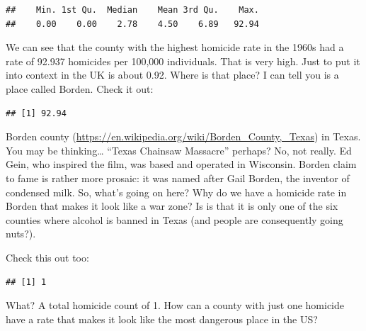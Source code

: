 \documentclass[
  krantz2]{krantz}
\makeatletter
\newenvironment{Shaded}{\begin{snugshade}}{\end{snugshade}}
\newcommand{\FunctionTok}[1]{\textcolor[rgb]{0,0,0}{#1}}
\newcommand{\NormalTok}[1]{#1}
\newcommand{\OtherTok}[1]{\textcolor[rgb]{0.37,0.37,0.37}{#1}}
\newcommand{\SpecialCharTok}[1]{\textcolor[rgb]{0,0,0}{#1}}
\newcommand{\StringTok}[1]{\textcolor[rgb]{0.5,0.5,0.5}{#1}}
\newenvironment{kframe}{%
\medskip{}
\setlength{\fboxsep}{.8em}
 \def\at@end@of@kframe{}%
 \ifinner\ifhmode%
  \def\at@end@of@kframe{\end{minipage}}%
  \begin{minipage}{\columnwidth}%
 \fi\fi%
 \def\FrameCommand##1{\hskip\@totalleftmargin \hskip-\fboxsep
 \colorbox{shadecolor}{##1}\hskip-\fboxsep
     \hskip-\linewidth \hskip-\@totalleftmargin \hskip\columnwidth}%
 \MakeFramed {\advance\hsize-\width
   \@totalleftmargin\z@ \linewidth\hsize
   \@setminipage}}%
 {\par\unskip\endMakeFramed%
 \at@end@of@kframe}
\renewenvironment{Shaded}{\begin{kframe}}{\end{kframe}}
\makeatother
\begin{document}
\begin{verbatim}
##    Min. 1st Qu.  Median    Mean 3rd Qu.    Max. 
##    0.00    0.00    2.78    4.50    6.89   92.94
\end{verbatim}

We can see that the county with the highest homicide rate in the 1960s had a rate of 92.937 homicides per 100,000 individuals. That is very high. Just to put it into context in the UK is about 0.92. Where is that place? I can tell you is a place called Borden. Check it out:

\begin{Shaded}
\end{Shaded}

\begin{verbatim}
## [1] 92.94
\end{verbatim}

Borden county (\url{https://en.wikipedia.org/wiki/Borden_County,_Texas}) in Texas. You may be thinking\ldots{} ``Texas Chainsaw Massacre'' perhaps? No, not really. Ed Gein, who inspired the film, was based and operated in Wisconsin. Borden claim to fame is rather more prosaic: it was named after Gail Borden, the inventor of condensed milk. So, what's going on here? Why do we have a homicide rate in Borden that makes it look like a war zone? Is is that it is only one of the six counties where alcohol is banned in Texas (and people are consequently going nuts?).

Check this out too:

\begin{Shaded}
\end{Shaded}

\begin{verbatim}
## [1] 1
\end{verbatim}

What? A total homicide count of 1. How can a county with just one homicide have a rate that makes it look like the most dangerous place in the US?

\begin{Shaded}
\end{Shaded}
\end{document}
